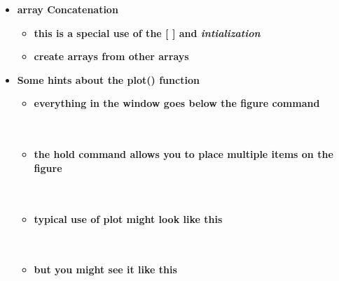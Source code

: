 \documentclass[11pt]{article}
\begin{document}
\begin{itemize}
\newpage
		\item \textbf{ \LARGE array  \color{mypurple}Concatenation \color{black} }\\
	
		\Large
		\begin{itemize}
			
			\item \textbf{ \Large this is a special use of the \color{mypurple}[ ] \color{black} and {\it intialization}} \\  \vspace{25mm}
			
			\item \textbf{ \Large create arrays from other arrays} \\  \vspace{15mm}
		\end{itemize}
		
\newpage
		\item \textbf{ \LARGE Some hints about the \color{mypurple}plot() \color{black}function }\\
	
		\Large
		\begin{itemize}

			
			\item \textbf{ \Large everything in the window goes below the figure command} \vspace{15mm} \\
				  \\\\
				 
			\item \textbf{ \Large the hold command allows you to place multiple items on the figure}\vspace{5mm} \\\\  
				 \vspace{5mm} \\
			
			\item \textbf{ \Large typical use of plot might look like this} \vspace{5mm} \\
				  \\\\
			
			\item \textbf{ \Large but you might see it like this} \vspace{5mm} \\
				  \\
				 	 

\end{itemize}
\end{itemize}
\end{document}
